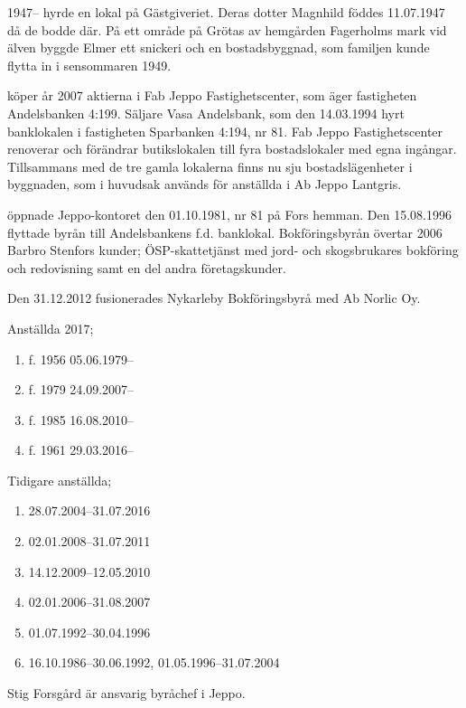 1947-- hyrde  en lokal på Gästgiveriet. Deras dotter Magnhild föddes 11.07.1947 då de bodde där.	På ett område på Grötas av hemgården Fagerholms mark vid älven byggde Elmer ett snickeri och en bostadsbyggnad, som familjen kunde flytta in i sensommaren 1949.





 köper år 2007 aktierna i Fab Jeppo Fastighetscenter, som äger fastigheten Andelsbanken 4:199.	Säljare Vasa Andelsbank, som den 14.03.1994 hyrt banklokalen i fastigheten Sparbanken 4:194, nr 81. Fab Jeppo Fastighetscenter renoverar och förändrar butikslokalen till fyra bostadslokaler med egna ingångar. Tillsammans med de tre gamla lokalerna finns nu sju bostadslägenheter i byggnaden, som i huvudsak används för anställda i Ab Jeppo Lantgris.



 öppnade Jeppo-kontoret den 01.10.1981, nr 81 på Fors hemman. Den 15.08.1996 flyttade byrån till Andelsbankens f.d. banklokal. Bokföringsbyrån övertar 2006 Barbro Stenfors kunder; ÖSP-skattetjänst med jord- och skogsbrukares bokföring och redovisning samt en del andra företagskunder.

Den 31.12.2012 fusionerades Nykarleby Bokföringsbyrå med Ab Norlic Oy.

Anställda 2017;
\begin{enumerate}
  \item {}     f. 1956   05.06.1979--
  \item {}      f. 1979	  24.09.2007--
  \item {}   f. 1985	  16.08.2010--
  \item {}  f. 1961	  29.03.2016--
\end{enumerate}

Tidigare anställda;
\begin{enumerate}
  \item {}    28.07.2004--31.07.2016
  \item {}            02.01.2008--31.07.2011
  \item {}      14.12.2009--12.05.2010
  \item {}     02.01.2006--31.08.2007
  \item {}           01.07.1992--30.04.1996
  \item {}          16.10.1986--30.06.1992, 01.05.1996--31.07.2004
\end{enumerate}
Stig Forsgård är ansvarig byråchef i Jeppo.


